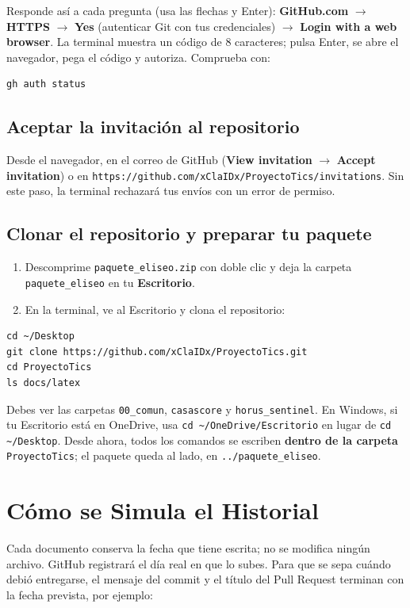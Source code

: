 \documentclass[11pt,a4paper]{article}
\begin{document}
\noindent Responde así a cada pregunta (usa las flechas y Enter): \textbf{GitHub.com} $\rightarrow$ \textbf{HTTPS} $\rightarrow$ \textbf{Yes} (autenticar Git con tus credenciales) $\rightarrow$ \textbf{Login with a web browser}. La terminal muestra un código de 8 caracteres; pulsa Enter, se abre el navegador, pega el código y autoriza. Comprueba con:

\begin{lstlisting}
gh auth status
\end{lstlisting}

\subsection{Aceptar la invitación al repositorio}
Desde el navegador, en el correo de GitHub (\textbf{View invitation} $\rightarrow$ \textbf{Accept invitation}) o en \nolinkurl{https://github.com/xClaIDx/ProyectoTics/invitations}. Sin este paso, la terminal rechazará tus envíos con un error de permiso.

\subsection{Clonar el repositorio y preparar tu paquete}
\begin{enumerate}[leftmargin=*]
    \item Descomprime \texttt{paquete\_eliseo.zip} con doble clic y deja la carpeta \texttt{paquete\_eliseo} en tu \textbf{Escritorio}.
    \item En la terminal, ve al Escritorio y clona el repositorio:
\end{enumerate}

\begin{lstlisting}
cd ~/Desktop
git clone https://github.com/xClaIDx/ProyectoTics.git
cd ProyectoTics
ls docs/latex
\end{lstlisting}

\noindent Debes ver las carpetas \texttt{00\_comun}, \texttt{casascore} y \texttt{horus\_sentinel}. En Windows, si tu Escritorio está en OneDrive, usa \nolinkurl{cd ~/OneDrive/Escritorio} en lugar de \nolinkurl{cd ~/Desktop}. Desde ahora, todos los comandos se escriben \textbf{dentro de la carpeta} \texttt{ProyectoTics}; el paquete queda al lado, en \nolinkurl{../paquete_eliseo}.


\section{Cómo se Simula el Historial}
Cada documento conserva la fecha que tiene escrita; no se modifica ningún archivo. GitHub registrará el día real en que lo subes. Para que se sepa cuándo debió entregarse, el mensaje del commit y el título del Pull Request terminan con la fecha prevista, por ejemplo:
\end{document}
